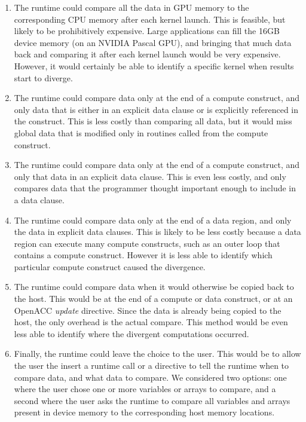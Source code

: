 \begin{enumerate}
\item The runtime could compare all the data in GPU memory to the corresponding CPU memory after each kernel launch.
This is feasible, but likely to be prohibitively expensive.
Large applications can fill the 16GB device memory (on an NVIDIA Pascal GPU), and bringing that much data back and comparing it after each kernel launch would be very expensive.
However, it would certainly be able to identify a specific kernel when results start to diverge.

\item The runtime could compare data only at the end of a compute construct, and only data that is either in an explicit data clause or is explicitly referenced in the construct.
This is less costly than comparing all data, but it would miss global data that is modified only in routines called from the compute construct.

\item The runtime could compare data only at the end of a compute construct, and only that data in an explicit data clause.
This is even less costly, and only compares data that the programmer thought important enough to include in a data clause.

\item The runtime could compare data only at the end of a data region, and only the data in explicit data clauses.
This is likely to be less costly because a data region can execute many compute constructs, such as an outer loop that contains a compute construct.
However it is less able to identify which particular compute construct caused the divergence.

\item The runtime could compare data when it would otherwise be copied back to the host.
This would be at the end of a compute or data construct, or at an OpenACC \emph{update} directive.
Since the data is already being copied to the host, the only overhead is the actual compare.
This method would be even less able to identify where the divergent computations occurred.

\item Finally, the runtime could leave the choice to the user.
This would be to allow the user the insert a runtime call or a directive to tell the runtime when to compare data, and what data to compare.
We considered two options: one where the user chose one or more variables or arrays to compare, and a second where the user asks the runtime to compare all variables and arrays present in device memory to the corresponding host memory locations.
\end{enumerate}

